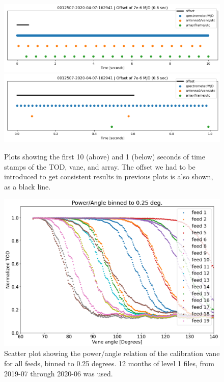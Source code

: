 \documentclass[10pt, a4paper]{article}
\begin{document}
\begin{figure}[h!]
    \centering
    \includegraphics[scale=0.6]{../times_20.png}
    \includegraphics[scale=0.6]{../times_2.png}
    \caption{Plots showing the first 10 (above) and 1 (below) seconds of time stamps of the TOD, vane, and array. The offset we had to be introduced to get consistent results in previous plots is also shown, as a black line.}
    \label{}
\end{figure}

\begin{figure}[h!]
    \centering
    \includegraphics[scale=0.5]{../binned_all.png}
    \caption{Scatter plot showing the power/angle relation of the calibration vane for all feeds, binned to 0.25 degrees. 12 months of level 1 files, from 2019-07 through 2020-06 was used.}
    \label{}
\end{figure}
\end{document}
